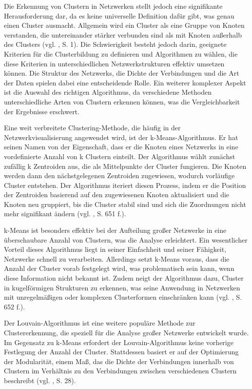 Die Erkennung von Clustern in Netzwerken stellt jedoch eine signifikante Herausforderung dar, da es keine universelle Definition dafür gibt, was genau einen Cluster ausmacht. Allgemein wird ein Cluster als eine Gruppe von Knoten verstanden, die untereinander stärker verbunden sind als mit Knoten außerhalb des Clusters (vgl. \cite{clustering:AlgosForClust}, S. 1). Die Schwierigkeit besteht jedoch darin, geeignete Kriterien für die Clusterbildung zu definieren und Algorithmen zu wählen, die diese Kriterien in unterschiedlichen Netzwerkstrukturen effektiv umsetzen können. Die Struktur des Netzwerks, die Dichte der Verbindungen und die Art der Daten spielen dabei eine entscheidende Rolle. Ein weiterer komplexer Aspekt ist die Auswahl des richtigen Algorithmus, da verschiedene Methoden unterschiedliche Arten von Clustern erkennen können, was die Vergleichbarkeit der Ergebnisse erschwert.

Eine weit verbreitete Clustering-Methode, die häufig in der Netzwerkvisualisierung angewendet wird, ist der k-Means-Algorithmus. Er hat seinen Namen von der Eigenschaft, dass er die Knoten eines Netzwerks in eine vordefinierte Anzahl von k Clustern einteilt. Der Algorithmus wählt zunächst zufällig k Zentroiden aus, die als Mittelpunkte der Cluster fungieren. Die Knoten werden dann den nächstgelegenen Zentroiden zugewiesen, wodurch vorläufige Cluster entstehen. Der Algorithmus iteriert diesen Prozess, indem er die Position der Zentroiden basierend auf den zugewiesenen Knoten aktualisiert und die Knoten neu gruppiert, bis die Cluster stabil sind und sich die Zuordnungen nicht mehr signifikant ändern (vgl. \cite{kmeans:Xu}, S. 651 f.).

k-Means ist besonders effektiv bei der Aufteilung großer Netzwerke in eine überschaubare Anzahl von Clustern, was die Analyse erleichtert. Ein wesentlicher Vorteil dieses Algorithmus liegt in seiner Einfachheit und seiner Fähigkeit, Netzwerke schnell zu verarbeiten. Allerdings setzt k-Means voraus, dass die Anzahl der Cluster vorab festgelegt wird, was problematisch sein kann, wenn diese Information nicht bekannt ist. Zudem neigt der Algorithmus dazu, Cluster in kugelförmigen Strukturen zu erkennen, was seine Anwendung in Netzwerken mit unregelmäßigen oder komplexen Clusterformen einschränken kann (vgl. \cite{kmeans:Xu}, S. 652 f.).

Der Louvain-Algorithmus ist eine weitere populäre Methode zur Clustererkennung, die speziell für die Analyse großer Netzwerke entwickelt wurde. Im Gegensatz zu k-Means erfordert der Louvain-Algorithmus keine vorherige Festlegung der Anzahl der Cluster. Stattdessen basiert er auf der Optimierung der Modularität, einem Maß, das die Dichte der Verbindungen innerhalb von Clustern im Verhältnis zu den Verbindungen zwischen verschiedenen Clustern beschreibt (vgl. \cite{louvain:Que}, S. 28).

